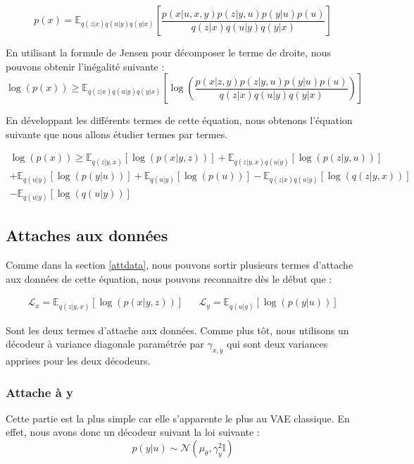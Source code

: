 \documentclass{article}
\begin{document}
\begin{equation*}
    p(x) = \mathbb{E}_{q(z|x)q(u|y)q(y|x)}\left[\frac{p(x|u,x,y)p(z|y,u)p(y|u)p(u)}{q(z|x)q(u|y)q(y|x)}\right]
\end{equation*}

En utilisant la formule de Jensen pour décomposer le terme de droite, nous pouvons obtenir l'inégalité suivante :
\begin{equation*}
    \log(p(x)) \geq \mathbb{E}_{q(z|x)q(u|y)q(y|x)}\left[\log\left(\frac{p(x|z,y)p(z|y,u)p(y|u)p(u)}{q(z|x)q(u|y)q(y|x)}\right)\right]
\end{equation*}

En développant les différents termes de cette équation, nous obtenons l'équation suivante que nous allons étudier termes par termes.

\begin{multline}
    \log(p(x)) \geq \mathbb{E}_{q(z|y,x)}\left[\log(p(x|y,z))\right] + \mathbb{E}_{q(z|y,x)q(u|y)}\left[\log(p(z|y,u))\right] \\+ \mathbb{E}_{q(u|y)}\left[\log(p(y|u))\right] + \mathbb{E}_{q(u|y)}\left[\log(p(u))\right] - \mathbb{E}_{q(z|x)q(u|y)}\left[\log(q(z|y,x))\right]\\ - \mathbb{E}_{q(u|y)}\left[\log(q(u|y))\right]
\end{multline}

\subsection{Attaches aux données}

Comme dans la section \ref{attdata}, nous pouvons sortir plusieurs termes d'attache aux données de cette équation, nous pouvons reconnaitre dès le début que :

\begin{align*}
    \mathcal{L}_x = \mathbb{E}_{q(z|y,x)}\left[\log(p(x|y,z))\right] && \mathcal{L}_y =\mathbb{E}_{q(u|y)}\left[\log(p(y|u))\right]
\end{align*}

Sont les deux termes d'attache aux données. Comme plus tôt, nous utilisons un décodeur à variance diagonale paramétrée par $\gamma_{x,y}$ qui sont deux variances apprises pour les deux décodeurs.

\subsubsection{Attache à y}

Cette partie est la plus simple car elle s'apparente le plus au VAE classique. En effet, nous avons donc un décodeur suivant la loi suivante :
\begin{equation}
    p(y|u) \sim \mathcal{N}(\mu_\theta, \gamma_y^2\mathbb{I})
\end{equation}
\end{document}
